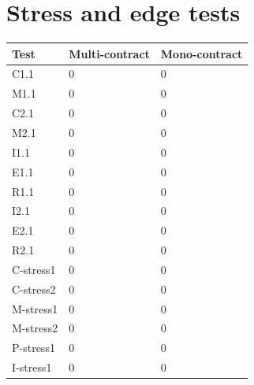\documentclass{article}
\begin{document}
	\section{Stress and edge tests}
	\label{app:stress-and-edge-tests}

		\begin{tabular}{| l | l | l |}
			\hline
			Test & Multi-contract & Mono-contract \\ \hline
			C1.1 & 0 & 0 \\ \hline
			M1.1 & 0 & 0 \\ \hline
			C2.1 & 0 & 0 \\ \hline
			M2.1 & 0 & 0 \\ \hline
			I1.1 & 0 & 0 \\ \hline
			E1.1 & 0 & 0 \\ \hline
			R1.1 & 0 & 0 \\ \hline
			I2.1 & 0 & 0 \\ \hline
			E2.1 & 0 & 0 \\ \hline
			R2.1 & 0 & 0 \\ \hline
			C-stress1 & 0 & 0 \\ \hline
			C-stress2 & 0 & 0 \\ \hline
			M-stress1 & 0 & 0 \\ \hline
			M-stress2 & 0 & 0 \\ \hline
			P-stress1 & 0 & 0 \\ \hline
			I-stress1 & 0 & 0 \\ \hline
			\hline
		\end{tabular}
\end{document}
